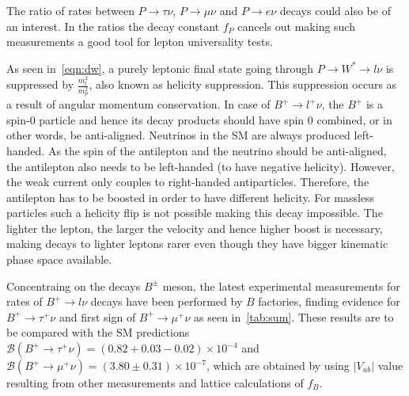 The ratio of rates between $P\rightarrow\tau\nu$, $P\rightarrow\mu\nu$ and $P\rightarrow e\nu$ decays could also be of an interest. In the ratios the decay constant $f_{P}$ cancels out making such measurements a good tool for lepton universality tests.

As seen in~\autoref{eqn:dw}, a purely leptonic final state going through $P\rightarrow W^{*}\rightarrow l \nu$ is suppressed by $\frac{m^{2}_{l}}{m^{2}_{p}}$, also known as helicity suppression. This suppression occurs as a result of angular momentum conservation. In case of $B^{+}\rightarrow l^{+} \nu$, the $B^{+}$ is a spin-0 particle and hence its decay products should have spin 0 combined, or in other words, be anti-aligned. Neutrinos in the \gls{SM} are always produced left-handed. As the spin of the antilepton and the neutrino should be anti-aligned, the antilepton also needs to be left-handed (to have negative helicity). However, the weak current only couples to right-handed antiparticles. Therefore, the antilepton has to be boosted in order to have different helicity. For massless particles such a helicity flip is not possible making this decay impossible. The lighter the lepton, the larger the velocity and hence higher boost is necessary, making decays to lighter leptons rarer even though they have bigger kinematic phase space available.

Concentraing on the decays $B^{\pm}$ meson, the latest experimental measurements for rates of $B^{+}\rightarrow l \nu$ decays have been performed by $B$ factories, finding evidence for $B^{+}\rightarrow \tau^{+}\nu$ and first sign of $B^{+}\rightarrow \mu^{+}\nu$ as seen in~\autoref{tab:sum}. These results are to be compared with the \gls{SM} predictions $\mathcal{B}(B^{+}\rightarrow \tau^{+}\nu) = (0.82+0.03-0.02)\times10^{-4}$\cite{Charles:2004jd} and $\mathcal{B}(B^{+}\rightarrow \mu^{+}\nu) = (3.80\pm0.31)\times10^{-7}$\cite{Sibidanov:2017vph}, which are obtained by using $|V_{ub}|$ value resulting from other measurements and lattice calculations of $f_{B}$. %



